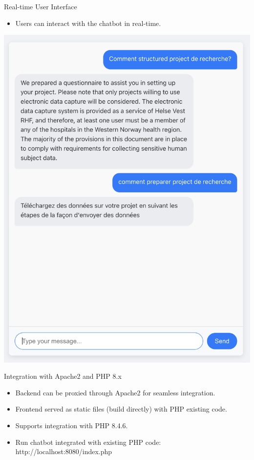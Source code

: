 \documentclass{beamer}
\begin{document}
\begin{frame}{Real-time User Interface}
    \begin{itemize}
        \item Users can interact with the chatbot in real-time.
    \end{itemize}
    \includegraphics[width=\textwidth]{ui-screenshot.png}
\end{frame}

\begin{frame}{Integration with Apache2 and PHP 8.x}
    \begin{itemize}
        \item Backend can be proxied through Apache2 for seamless integration.
        \item Frontend served as static files (build directly) with PHP existing code.
        \item Supports integration with PHP 8.4.6.
        \item Run chatbot integrated with existing PHP code: http://localhost:8080/index.php
    \end{itemize}
\end{frame}
\end{document}
